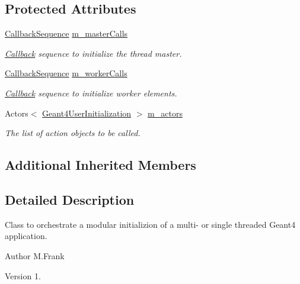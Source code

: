 \subsection*{Protected Attributes}
\begin{DoxyCompactItemize}
\item 
\hyperlink{struct_d_d4hep_1_1_callback_sequence}{Callback\+Sequence} \hyperlink{class_d_d4hep_1_1_simulation_1_1_geant4_user_initialization_sequence_a3a7aa9cf5219734877b0ab71da54bb29}{m\+\_\+master\+Calls}
\begin{DoxyCompactList}\small\item\em \hyperlink{class_d_d4hep_1_1_callback}{Callback} sequence to initialize the thread master. \end{DoxyCompactList}\item 
\hyperlink{struct_d_d4hep_1_1_callback_sequence}{Callback\+Sequence} \hyperlink{class_d_d4hep_1_1_simulation_1_1_geant4_user_initialization_sequence_a85de09bfc3a69485391fb549a457cf7e}{m\+\_\+worker\+Calls}
\begin{DoxyCompactList}\small\item\em \hyperlink{class_d_d4hep_1_1_callback}{Callback} sequence to initialize worker elements. \end{DoxyCompactList}\item 
Actors$<$ \hyperlink{class_d_d4hep_1_1_simulation_1_1_geant4_user_initialization}{Geant4\+User\+Initialization} $>$ \hyperlink{class_d_d4hep_1_1_simulation_1_1_geant4_user_initialization_sequence_a9239c0d702fcde97c6bc6387af30c09e}{m\+\_\+actors}
\begin{DoxyCompactList}\small\item\em The list of action objects to be called. \end{DoxyCompactList}\end{DoxyCompactItemize}
\subsection*{Additional Inherited Members}


\subsection{Detailed Description}
Class to orchestrate a modular initializion of a multi-\/ or single threaded Geant4 application. 

\begin{DoxyAuthor}{Author}
M.\+Frank 
\end{DoxyAuthor}
\begin{DoxyVersion}{Version}
1. 
\end{DoxyVersion}


